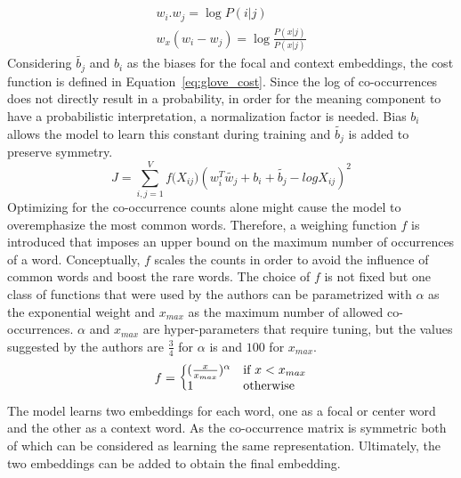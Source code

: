 \begin{equation}
\begin{split}
\\ w_{ i }.w_{ j }=\log { P(i|j)\quad  } \\
w_{ x }(w_{ i }-w_{ j })=\log { \frac { P(x|j) }{ P(x|j) } } 
\end{split}
\label{eq:log_prob}
\end{equation}
Considering $ \tilde{b_{ j }}$ and $b_{ i }$  as the biases for the focal and context embeddings, the cost function is defined in Equation~\ref{eq:glove_cost}. Since the log of co-occurrences does not directly result in a probability, in order for the meaning component to have a probabilistic interpretation, a normalization factor is needed. Bias $b_{ i }$ allows the model to learn this constant during training and $ \tilde{b_{ j }}$ is added to preserve symmetry. 
\begin{equation}
J=\sum _{ i,j=1 }^{ V }{ f({ X }_{ ij } } )(w_{ i }^{ T }\tilde{  w_{ j } } +b_{ i }+\tilde{  b_{ j } } -log{ X }_{ ij })^2
\label{eq:glove_cost}
\end{equation}
Optimizing for the co-occurrence counts alone might cause the model to overemphasize the most common words. Therefore, a weighing function $f$ is introduced that imposes an upper bound on the maximum number of occurrences of a word. Conceptually, $f$ scales the counts in order to avoid the influence of common words and boost the rare words. The choice of $f$ is not fixed but one class of functions that were used by the authors can be parametrized with $\alpha$ as the exponential weight and $x_{max}$ as the maximum number of allowed co-occurrences. $\alpha$ and $x_{max}$ are hyper-parameters that require tuning, but the values suggested by the authors are $\frac{3}{4}$ for $\alpha$ is  and $100$ for $x_{max}$. 
\begin{equation}
f=\left\{
  \begin{array}{@{}ll@{}}
    (\frac { x }{ { x }_{ max } } )^{ \alpha  }& \text{if}\ x<x_{max} \\
    1 & \text{otherwise}
  \end{array}\right.
\label{eq:weighingfunction}
\end{equation}
\noindent
The model learns two embeddings for each word, one as a focal or center word and the other as a context word. As the co-occurrence matrix is symmetric both of which can be considered as learning the same representation. Ultimately, the two embeddings can be added to obtain the final embedding.

